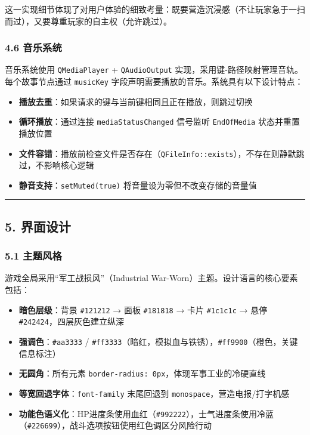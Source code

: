 这一实现细节体现了对用户体验的细致考量：既要营造沉浸感（不让玩家急于一扫而过），又要尊重玩家的自主权（允许跳过）。

\hypertarget{ux97f3ux4e50ux7cfbux7edf}{%
\subsubsection{4.6 音乐系统}\label{ux97f3ux4e50ux7cfbux7edf}}

音乐系统使用 \texttt{QMediaPlayer} + \texttt{QAudioOutput}
实现，采用键-路径映射管理音轨。每个故事节点通过 \texttt{musicKey}
字段声明需要播放的音乐。系统具有以下设计特点：

\begin{itemize}
\tightlist
\item
  \textbf{播放去重}：如果请求的键与当前键相同且正在播放，则跳过切换
\item
  \textbf{循环播放}：通过连接 \texttt{mediaStatusChanged} 信号监听
  \texttt{EndOfMedia} 状态并重置播放位置
\item
  \textbf{文件容错}：播放前检查文件是否存在（\texttt{QFileInfo::exists}），不存在则静默跳过，不影响核心逻辑
\item
  \textbf{静音支持}：\texttt{setMuted(true)}
  将音量设为零但不改变存储的音量值
\end{itemize}

\begin{center}\rule{0.5\linewidth}{0.5pt}\end{center}

\hypertarget{ux754cux9762ux8bbeux8ba1}{%
\subsection{5. 界面设计}\label{ux754cux9762ux8bbeux8ba1}}

\hypertarget{ux4e3bux9898ux98ceux683c}{%
\subsubsection{5.1 主题风格}\label{ux4e3bux9898ux98ceux683c}}

游戏全局采用``军工战损风''（Industrial
War-Worn）主题。设计语言的核心要素包括：

\begin{itemize}
\tightlist
\item
  \textbf{暗色层级}：背景 \texttt{\#121212} → 面板 \texttt{\#181818} →
  卡片 \texttt{\#1c1c1c} → 悬停 \texttt{\#242424}，四层灰色建立纵深
\item
  \textbf{强调色}：\texttt{\#aa3333} /
  \texttt{\#ff3333}（暗红，模拟血与铁锈），\texttt{\#ff9900}（橙色，关键信息标注）
\item
  \textbf{无圆角}：所有元素
  \texttt{border-radius:\ 0px}，体现军事工业的冷硬直线
\item
  \textbf{等宽回退字体}：\texttt{font-family} 末尾回退到
  \texttt{monospace}，营造电报/打字机感
\item
  \textbf{功能色语义化}：HP进度条使用血红（\texttt{\#992222}），士气进度条使用冷蓝（\texttt{\#226699}），战斗选项按钮使用红色调区分风险行动
\end{itemize}

